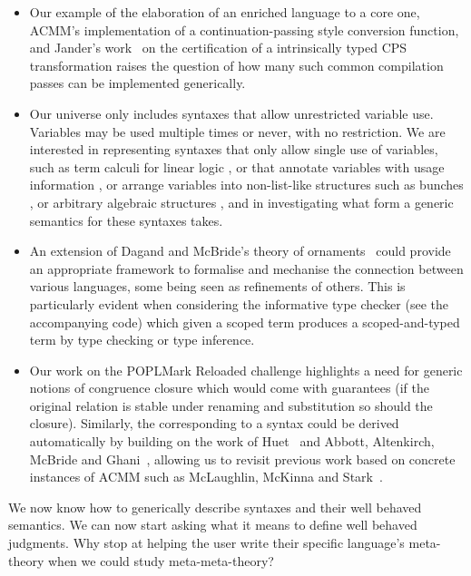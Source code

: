 \begin{itemize}
\item Our example of the elaboration of an enriched language to a core
  one, ACMM's implementation of a continuation-passing style
  conversion function, and Jander's work~\citeyear{Jander:Thesis:2019}
  on the certification of a intrinsically typed CPS transformation
  raises the question of how many such common compilation passes can
  be implemented generically.
\item Our universe only includes syntaxes that allow unrestricted
  variable use. Variables may be used multiple times or never, with no
  restriction. We are interested in representing syntaxes that only
  allow single use of variables, such as term calculi for linear logic
  \cite{DBLP:conf/tlca/BentonBPH93,barber96dual,context-constrained},
  or that annotate variables with usage information
  \cite{BrunelGMZ14,GhicaS14,PetricekOM14}, or arrange variables into
  non-list-like structures such as bunches
  \cite{DBLP:journals/jfp/OHearn03}, or arbitrary algebraic structures
  \cite{DBLP:conf/rta/LicataSR17}, and in investigating what form a
  generic semantics for these syntaxes takes.
\item An extension of Dagand and McBride's theory of
  ornaments~\citeyear{DBLP:journals/jfp/DagandM14} could provide an
  appropriate framework to formalise and mechanise the connection
  between various languages, some being seen as refinements of
  others. This is particularly evident when considering the
  informative type checker (see the accompanying code) which given a
  scoped term produces a scoped-and-typed term by type checking or
  type inference.
\item Our work on the POPLMark Reloaded challenge highlights a need
  for generic notions of congruence closure which would come with
  guarantees (if the original relation is stable under renaming and
  substitution so should the closure).  Similarly, the  corresponding to a syntax could be derived automatically
  by building on the work of Huet~\citeyear{huet_1997} and Abbott,
  Altenkirch, McBride and
  Ghani~\citeyear{DBLP:journals/fuin/AbbottAMG05}, allowing us to
  revisit previous work based on concrete instances of ACMM such as
  McLaughlin, McKinna and Stark~\citeyear{craig2018triangle}.
\end{itemize}

We now know how to generically describe syntaxes and their well
behaved semantics. We can now start asking what it means to define
well behaved judgments. Why stop at helping the user write their
specific language's meta-theory when we could study meta-meta-theory?
